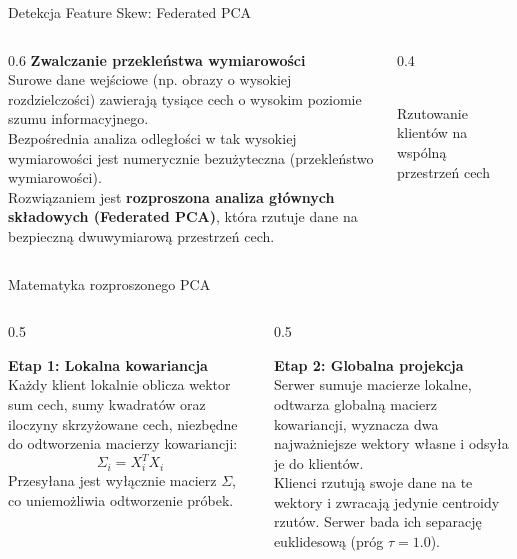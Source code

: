 \documentclass[9pt,aspectratio=169]{beamer}
\begin{document}
\begin{frame}{Detekcja Feature Skew: Federated PCA}
\begin{columns}[T]
\begin{column}{0.6\textwidth}
\textbf{Zwalczanie przekleństwa wymiarowości}\\[4pt]
Surowe dane wejściowe (np. obrazy o wysokiej rozdzielczości) zawierają tysiące cech o wysokim poziomie szumu informacyjnego.\\[6pt]
Bezpośrednia analiza odległości w tak wysokiej wymiarowości jest numerycznie bezużyteczna (przekleństwo wymiarowości).\\[6pt]
Rozwiązaniem jest \textbf{rozproszona analiza głównych składowych (Federated PCA)}, która rzutuje dane na bezpieczną dwuwymiarową przestrzeń cech.
\end{column}
\begin{column}{0.4\textwidth}
\centering
{}\\
{\tiny Rzutowanie klientów na wspólną przestrzeń cech}
\end{column}
\end{columns}
\end{frame}

\begin{frame}{Matematyka rozproszonego PCA}
\begin{columns}[T]
\begin{column}{0.5\textwidth}
\begin{cardpurple}
\textbf{Etap 1: Lokalna kowariancja}\\[6pt]
\footnotesize Każdy klient lokalnie oblicza wektor sum cech, sumy kwadratów oraz iloczyny skrzyżowane cech, niezbędne do odtworzenia macierzy kowariancji:
\[
\Sigma_i = X_i^T X_i
\]
{\footnotesize Przesyłana jest wyłącznie macierz $\Sigma$, co uniemożliwia odtworzenie próbek.}
\end{cardpurple}
\end{column}
\begin{column}{0.5\textwidth}
\begin{cardgreen}
\textbf{Etap 2: Globalna projekcja}\\[6pt]
\footnotesize Serwer sumuje macierze lokalne, odtwarza globalną macierz kowariancji, wyznacza dwa najważniejsze wektory własne i odsyła je do klientów.\\[6pt]
Klienci rzutują swoje dane na te wektory i zwracają jedynie centroidy rzutów. Serwer bada ich separację euklidesową (próg $\tau=1.0$).
\end{cardgreen}
\end{column}
\end{columns}
\end{frame}
\end{document}
